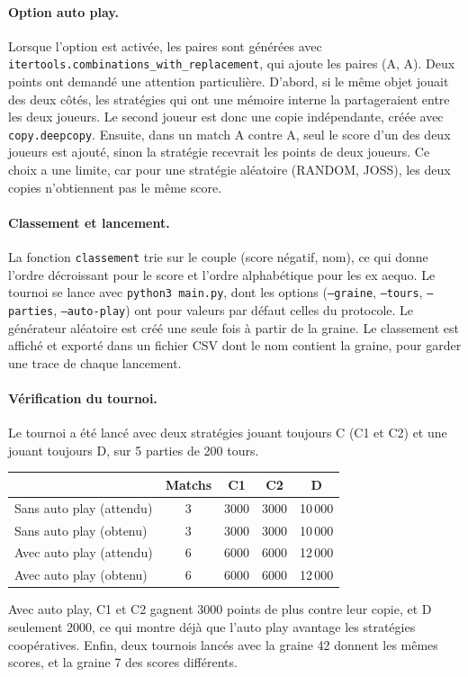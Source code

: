 \documentclass[11pt,a4paper]{article}
\begin{document}
\paragraph{Option auto play.} Lorsque l'option est activée, les paires sont générées avec
\texttt{itertools.combinations\_with\_replacement}, qui ajoute les paires (A, A). Deux points ont demandé une attention
particulière. D'abord, si le même objet jouait des deux côtés, les stratégies qui ont une mémoire interne la partageraient entre
les deux joueurs. Le second joueur est donc une copie indépendante, créée avec \texttt{copy.deepcopy}. Ensuite, dans un match
A contre A, seul le score d'un des deux joueurs est ajouté, sinon la stratégie recevrait les points de deux joueurs. Ce choix a
une limite, car pour une stratégie aléatoire (RANDOM, JOSS), les deux copies n'obtiennent pas le même score.

\paragraph{Classement et lancement.} La fonction \texttt{classement} trie sur le couple (score négatif, nom), ce qui donne
l'ordre décroissant pour le score et l'ordre alphabétique pour les ex aequo. Le tournoi se lance avec
\texttt{python3 main.py}, dont les options (\texttt{--graine}, \texttt{--tours}, \texttt{--parties}, \texttt{--auto-play}) ont
pour valeurs par défaut celles du protocole. Le générateur aléatoire est créé une seule fois à partir de la graine. Le
classement est affiché et exporté dans un fichier CSV dont le nom contient la graine, pour garder une trace de chaque lancement.

\paragraph{Vérification du tournoi.} Le tournoi a été lancé avec deux stratégies jouant toujours C (C1 et C2) et une jouant
toujours D, sur 5 parties de 200 tours.
\begin{center}
\begin{tabular}{lcccc}
\toprule
 & Matchs & C1 & C2 & D \\
\midrule
Sans auto play (attendu) & 3 & 3000 & 3000 & 10\,000 \\
Sans auto play (obtenu) & 3 & 3000 & 3000 & 10\,000 \\
Avec auto play (attendu) & 6 & 6000 & 6000 & 12\,000 \\
Avec auto play (obtenu) & 6 & 6000 & 6000 & 12\,000 \\
\bottomrule
\end{tabular}
\end{center}
Avec auto play, C1 et C2 gagnent 3000 points de plus contre leur copie, et D seulement 2000, ce qui montre déjà que l'auto play
avantage les stratégies coopératives. Enfin, deux tournois lancés avec la graine 42 donnent les mêmes scores, et la graine 7 des scores différents.
\end{document}
